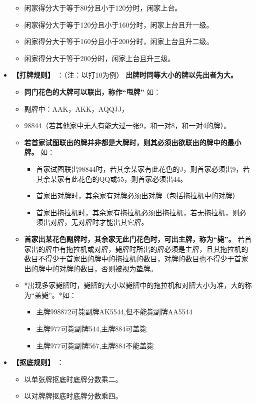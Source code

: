 \documentclass[9pt, b5paper]{article}
\begin{document}
\begin{itemize}
\begin{itemize}
\item 闲家得分大于等于80分且小于120分时，闲家上台。
\item 闲家得分大于等于120分且小于160分时，闲家上台且升一级。
\item 闲家得分大于等于160分且小于200分时，闲家上台且升二级。
\item 闲家得分大于等于200分时，闲家上台且升三级。
\end{itemize}
\item \textbf{【打牌规则】} ：（注：以打10为例） \textbf{出牌时同等大小的牌以先出者为大。}
\begin{itemize}
\item \textbf{同门花色的大牌可以联出，称作“甩牌”} 如：
\item 副牌中：AAK，AKK，AQQJJ，
\item 98844（若其他家中无人有能大过一张9，和一对8，和一对4的牌）。
\item \textbf{若首家试图联出的牌并非都是大牌时，则其必须出欲联出的牌中的最小牌。} 如：
\begin{itemize}
\item 首家试图联出98844时，若其余某家有此花色的J，则首家必须出9，若其余某家有此花色的QQ或55，则首家必须出44。
\item 首家出对牌时，其余家有对牌必须出对牌（包括拖拉机中的对牌）
\item 首家出拖拉机时，其余家有拖拉机必须出拖拉机，若无拖拉机，则必须出对牌，无对牌时才能出其它牌。
\end{itemize}
\item \textbf{首家出某花色副牌时，其余家无此门花色时，可出主牌，称为“毙”。} 若首家出的牌中有拖拉机或对牌，毙牌时所出的牌必须是主牌，且其拖拉机的数目不得少于首家出的牌中的拖拉机的数目，对牌的数目也不得少于首家出的牌中的对牌的数目，否则被视为垫牌。
\item *出现多家毙牌时，毙牌的大小以毙牌中的拖拉机和对牌大小为准，大的称为“盖毙”。*如：
\begin{itemize}
\item 主牌998872可毙副牌AK5544,但不能毙副牌AA5544
\item 主牌977可毙副牌544,主牌884可盖毙
\item 主牌977可毙副牌567,主牌884不能盖毙
\end{itemize}
\end{itemize}
\item \textbf{【抠底规则】} ：
\begin{itemize}
\item 以单张牌抠底时底牌分数乘二。
\item 以对牌牌抠底时底牌分数乘四。

\end{itemize}
\end{itemize}
\end{document}
